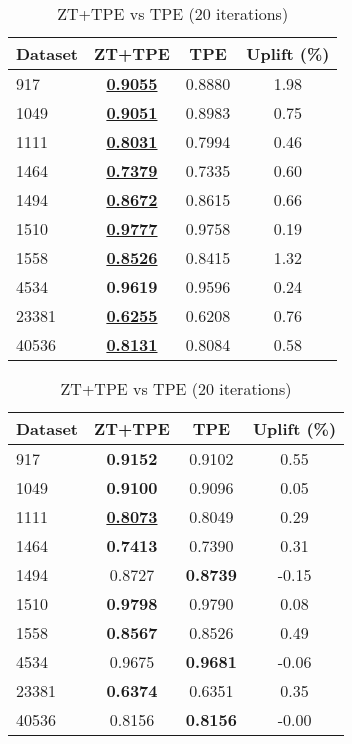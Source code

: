 \begin{table}[htbp]
\begin{center}
\begin{small}
\begin{sc}
\begin{subtable}[t]{0.48\textwidth}
    \centering
    \caption{ZT+TPE vs TPE (10 iterations)}
    \label{tab:decisiontree-optuna-10}
    \begin{tabular}{lccc}
    \toprule
    \textbf{Dataset} & \textbf{ZT+TPE} & \textbf{TPE} & \textbf{Uplift (\%)} \\
    \midrule
    917    & \underline{\textbf{0.9055}} & 0.8880 & 1.98 \\
    1049    & \underline{\textbf{0.9051}} & 0.8983 & 0.75 \\
    1111    & \underline{\textbf{0.8031}} & 0.7994 & 0.46 \\
    1464    & \underline{\textbf{0.7379}} & 0.7335 & 0.60 \\
    1494    & \underline{\textbf{0.8672}} & 0.8615 & 0.66 \\
    1510    & \underline{\textbf{0.9777}} & 0.9758 & 0.19 \\
    1558    & \underline{\textbf{0.8526}} & 0.8415 & 1.32 \\
    4534    & \textbf{0.9619} & 0.9596 & 0.24 \\
    23381    & \underline{\textbf{0.6255}} & 0.6208 & 0.76 \\
    40536    & \underline{\textbf{0.8131}} & 0.8084 & 0.58 \\
    \bottomrule
    \end{tabular}
\end{subtable}
\hfill
\begin{subtable}[t]{0.48\textwidth}
    \centering
    \caption{ZT+TPE vs TPE (20 iterations)}
    \label{tab:decisiontree-optuna-20}
    \begin{tabular}{lccc}
    \toprule
    \textbf{Dataset} & \textbf{ZT+TPE} & \textbf{TPE} & \textbf{Uplift (\%)} \\
    \midrule
    917    & \textbf{0.9152} & 0.9102 & 0.55 \\
    1049    & \textbf{0.9100} & 0.9096 & 0.05 \\
    1111    & \underline{\textbf{0.8073}} & 0.8049 & 0.29 \\
    1464    & \textbf{0.7413} & 0.7390 & 0.31 \\
    1494    & 0.8727 & \textbf{0.8739} & -0.15 \\
    1510    & \textbf{0.9798} & 0.9790 & 0.08 \\
    1558    & \textbf{0.8567} & 0.8526 & 0.49 \\
    4534    & 0.9675 & \textbf{0.9681} & -0.06 \\
    23381    & \textbf{0.6374} & 0.6351 & 0.35 \\
    40536    & 0.8156 & \textbf{0.8156} & -0.00 \\
    \bottomrule
    \end{tabular}
\end{subtable}

\end{sc}
\end{small}
\end{center}
\vskip -0.1in
\end{table}